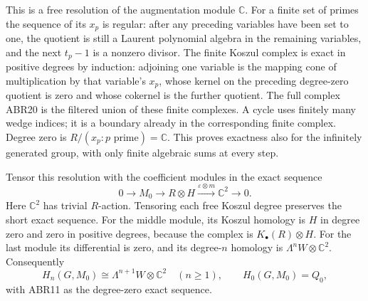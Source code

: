 \documentclass[11pt]{article}
\begin{document}
This is a free resolution of the augmentation module $\mathbb C$.
For a finite set of primes the sequence of its $x_p$ is regular:
after any preceding variables have been set to one, the quotient
is still a Laurent polynomial algebra in the remaining variables,
and the next $t_p-1$ is a nonzero divisor. The finite Koszul complex
is exact in positive degrees by induction: adjoining one variable
is the mapping cone of multiplication by that variable's $x_p$,
whose kernel on the preceding degree-zero quotient is zero and
whose cokernel is the further quotient. The full complex ABR20 is
the filtered union of these finite complexes. A cycle uses finitely
many wedge indices; it is a boundary already in the corresponding
finite complex. Degree zero is $R/(x_p:p\text{ prime})=\mathbb C$.
This proves exactness also for the infinitely generated group, with
only finite algebraic sums at every step.

Tensor this resolution with the coefficient modules in the exact
sequence
\[
 0\longrightarrow M_0\longrightarrow R\otimes H
          \xrightarrow{\varepsilon\otimes m}\mathbb C^2
          \longrightarrow0.
\]
Here $\mathbb C^2$ has trivial $R$-action. Tensoring each free
Koszul degree preserves the short exact sequence. For the middle
module, its Koszul homology is $H$ in degree zero and zero in
positive degrees, because the complex is $K_\bullet(R)\otimes H$.
For the last module its differential is zero, and its degree-$n$
homology is $\Lambda^nW\otimes\mathbb C^2$. Consequently
\begin{equation}\tag{ABR21}
 H_n(G,M_0)\cong\Lambda^{n+1}W\otimes\mathbb C^2
            \quad(n\ge1),
 \qquad H_0(G,M_0)=Q_0,
\end{equation}
with ABR11 as the degree-zero exact sequence.
\end{document}
